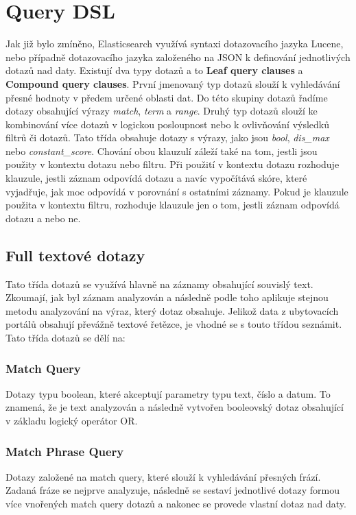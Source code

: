 \documentclass[czech,BP]{thesiskiv}
\begin{document}
\section{Query DSL}
Jak již bylo zmíněno, Elasticsearch využívá syntaxi dotazovacího jazyka Lucene, nebo případně dotazovacího jazyka založeného na JSON k definování jednotlivých dotazů nad daty. Existují dva typy dotazů a to \textbf{Leaf query clauses} a \textbf{Compound query clauses}. První jmenovaný typ dotazů slouží k vyhledávání přesné hodnoty v předem určené oblasti dat. Do této skupiny dotazů řadíme dotazy obsahující výrazy \textit{match}, \textit{term} a \textit{range}. Druhý typ dotazů slouží ke kombinování více dotazů v logickou posloupnost nebo k ovlivňování výsledků filtrů či dotazů. Tato třída obsahuje dotazy s výrazy, jako jsou \textit{bool}, \textit{dis\_max} nebo \textit{constant\_score}. Chování obou klauzulí záleží také na tom, jestli jsou použity v kontextu dotazu nebo filtru. Při použití v kontextu dotazu rozhoduje klauzule, jestli záznam odpovídá dotazu a navíc vypočítává skóre, které vyjadřuje, jak moc odpovídá v porovnání s ostatními záznamy. Pokud je klauzule použita v kontextu filtru, rozhoduje klauzule jen o tom, jestli záznam odpovídá dotazu a nebo ne. \cite{QueryDSL}

\subsection{Full textové dotazy}
Tato třída dotazů se využívá hlavně na záznamy obsahující souvislý text. Zkoumají, jak byl záznam analyzován a následně podle toho aplikuje stejnou metodu analyzování na výraz, který dotaz obsahuje. Jelikož data z ubytovacích portálů obsahují převážně textové řetězce, je vhodné se s touto třídou seznámit. Tato třída dotazů se dělí na:

\subsubsection{Match Query}
Dotazy typu boolean, které akceptují parametry typu text, číslo a datum. To znamená, že je text analyzován a následně vytvořen booleovský dotaz obsahující v základu logický operátor OR.

\subsubsection{Match Phrase Query}
Dotazy založené na match query, které slouží k vyhledávání přesných frází. Zadaná fráze se nejprve analyzuje, následně se sestaví jednotlivé dotazy formou více vnořených match query dotazů a nakonec se provede vlastní dotaz nad daty.
\end{document}
